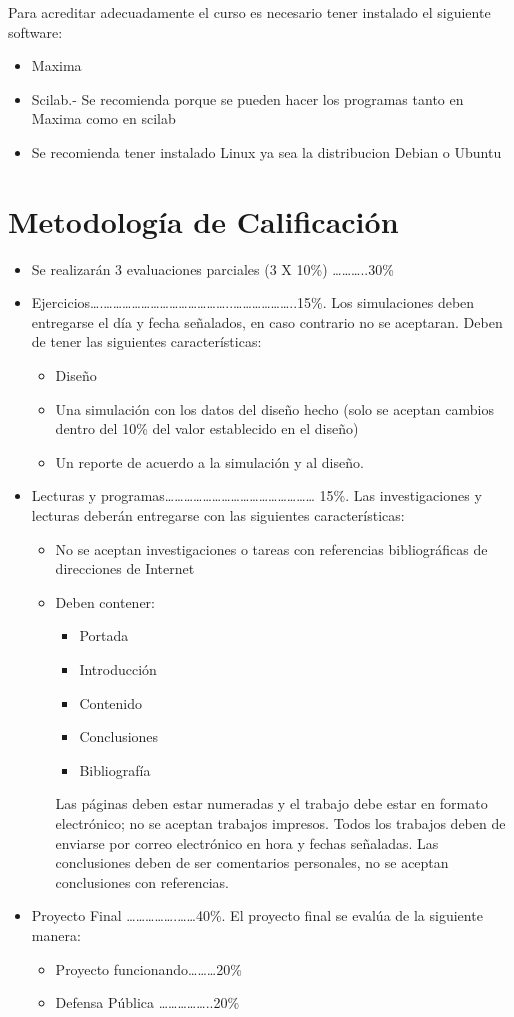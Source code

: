\documentclass[12pt]{book}
\theoremstyle{definition}
\theoremstyle{remark}
\theoremstyle{plain}
\begin{document}
Para acreditar adecuadamente el curso es necesario tener instalado el siguiente software:
\begin{itemize}
 \item Maxima
 \item Scilab.- Se recomienda porque se pueden hacer los programas tanto en Maxima como en scilab
 \item Se recomienda tener instalado Linux ya sea la distribucion Debian o Ubuntu
\end{itemize}

\section{Metodología de Calificación}
\begin{itemize}
 \item Se realizarán 3 evaluaciones parciales (3 X 10\%) ………..30\%
 \item Ejercicios….…………………………………..………………..15\%. Los simulaciones deben entregarse el día y fecha señalados, 
en caso contrario no se aceptaran. Deben de tener las siguientes características:
      \begin{itemize}
	\item Diseño
	\item Una simulación con los datos del diseño hecho (solo se aceptan cambios dentro del 10\% del valor establecido en el diseño)
	\item Un reporte de acuerdo a la simulación y al diseño.
      \end{itemize}
 \item Lecturas y programas…………………………………………         15\%. Las investigaciones y lecturas deberán entregarse con las siguientes características:
      \begin{itemize}
	\item No se aceptan investigaciones o tareas con referencias bibliográficas de direcciones de Internet
	\item Deben contener:
	    \begin{itemize}
	      \item Portada
	      \item Introducción
	      \item Contenido
	      \item Conclusiones
	      \item Bibliografía
	    \end{itemize}
	Las páginas deben estar numeradas y el trabajo debe estar en formato electrónico; no se aceptan trabajos impresos. Todos los 
	trabajos deben de enviarse por correo electrónico en hora y fechas señaladas. Las conclusiones deben de ser comentarios personales, 
	no se aceptan conclusiones con referencias. 
      \end{itemize}
 \item Proyecto Final …………….……40\%. El proyecto final se evalúa de la siguiente manera:
      \begin{itemize}
	\item Proyecto funcionando………20\%
	\item Defensa Pública ……………..20\%
      \end{itemize}
\end{itemize}
\end{document}
